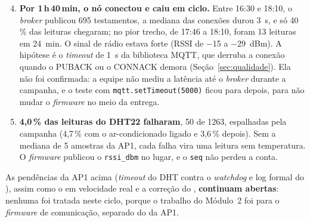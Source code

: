 \begin{enumerate}
  \setcounter{enumi}{3}
  \item \textbf{Por 1\,h\,40\,min, o nó conectou e caiu em ciclo.} Entre
    16:30 e 18:10, o \emph{broker} publicou 695 testamentos, a mediana
    das conexões durou \SI{3}{\second}, e só 40\,\% das leituras
    chegaram; no pior trecho, de 17:46 a 18:10, foram 13 leituras em
    \SI{24}{\minute}. O sinal de rádio estava forte (RSSI de
    \SI{-15}{} a \SI{-29}{dBm}). A hipótese é o \emph{timeout} de
    \SI{1}{\second} da biblioteca MQTT, que derruba a conexão quando o
    PUBACK ou o CONNACK demora (Seção~\ref{sec:qualidade}). Ela não foi
    confirmada: a equipe não mediu a latência até o \emph{broker}
    durante a campanha, e o teste com \texttt{mqtt.setTimeout(5000)}
    ficou para depois, para não mudar o \emph{firmware} no meio da
    entrega.
  \item \textbf{4,0\,\% das leituras do DHT22 falharam}, 50 de
    \num{1263}, espalhadas pela campanha (4,7\,\% com o ar-condicionado
    ligado e 3,6\,\% depois). Sem a mediana de 5 amostras da AP1, cada
    falha vira uma leitura sem temperatura. O \emph{firmware} publicou o
    \texttt{rssi\_dbm} no lugar, e o \texttt{seq} não perdeu a conta.
\end{enumerate}

\noindent As pendências da AP1 acima (\emph{timeout} do DHT contra o
\emph{watchdog} e log formal do ), assim como o  em
velocidade real e a correção do , \textbf{continuam abertas}:
nenhuma foi tratada neste ciclo, porque o trabalho do Módulo~2 foi para o
\emph{firmware} de comunicação, separado do da AP1.
